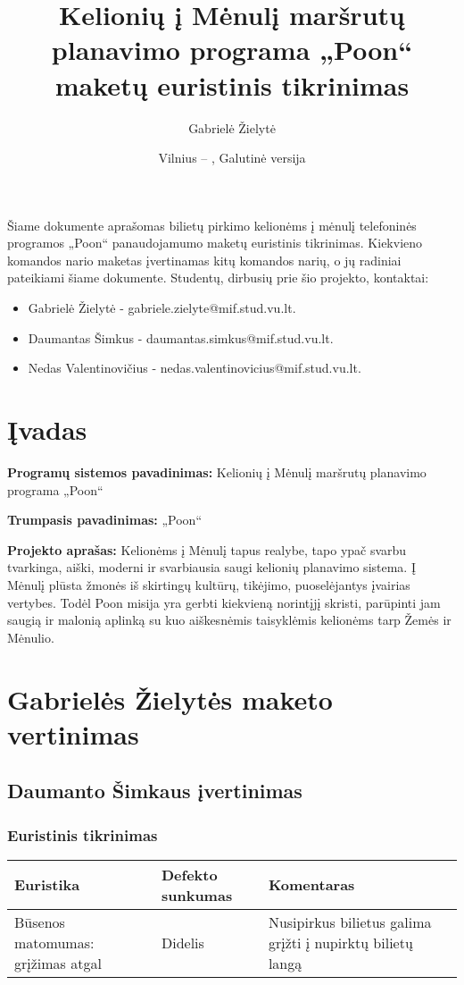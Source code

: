 \documentclass{VUMIFPSkursinis}
\title{Kelionių į Mėnulį maršrutų planavimo programa „Poon“ maketų euristinis tikrinimas}
\author{Gabrielė Žielytė}
\date{Vilnius – \the\year, Galutinė versija}
\begin{document}
	
\maketitle

\thispagestyle{empty}
\tableofcontents


Šiame dokumente aprašomas bilietų pirkimo kelionėms į mėnulį telefoninės programos „Poon“ panaudojamumo maketų euristinis tikrinimas. Kiekvieno komandos nario maketas įvertinamas kitų komandos narių, o jų radiniai pateikiami šiame dokumente. Studentų, dirbusių prie šio projekto, kontaktai:
\begin{itemize}
\item Gabrielė Žielytė - gabriele.zielyte@mif.stud.vu.lt. 
\item Daumantas Šimkus - daumantas.simkus@mif.stud.vu.lt. 
\item Nedas Valentinovičius - nedas.valentinovicius@mif.stud.vu.lt.
\end{itemize}
\thispagestyle{empty}

\cleardoublepage{}
\setcounter{page}{4}

\section{Įvadas}
\textbf{Programų sistemos pavadinimas: } Kelionių į Mėnulį maršrutų planavimo programa „Poon“
\bigskip

\textbf{Trumpasis pavadinimas: } „Poon“
\bigskip




\textbf{Projekto aprašas: } Kelionėms į Mėnulį tapus realybe, tapo ypač svarbu tvarkinga, aiški, moderni ir svarbiausia saugi kelionių planavimo sistema. Į Mėnulį plūsta žmonės iš skirtingų kultūrų, tikėjimo, puoselėjantys įvairias vertybes. Todėl Poon misija yra gerbti kiekvieną norintįjį skristi, parūpinti jam saugią ir malonią aplinką su kuo aiškesnėmis taisyklėmis kelionėms tarp Žemės ir Mėnulio.


\section{Gabrielės Žielytės maketo vertinimas}
\subsection{Daumanto Šimkaus įvertinimas}
\subsubsection{Euristinis tikrinimas}
\begin{center}
 \begin{tabular}{|| p{4cm} | p{4cm} | p{8cm} ||} 
 \hline
 Euristika & Defekto sunkumas & Komentaras \\
 \hline\hline
 Būsenos matomumas: grįžimas atgal & Didelis & Nusipirkus bilietus galima grįžti į nupirktų bilietų langą\\ 
 \hline
\end{tabular}	
\end{center}
\end{document}
